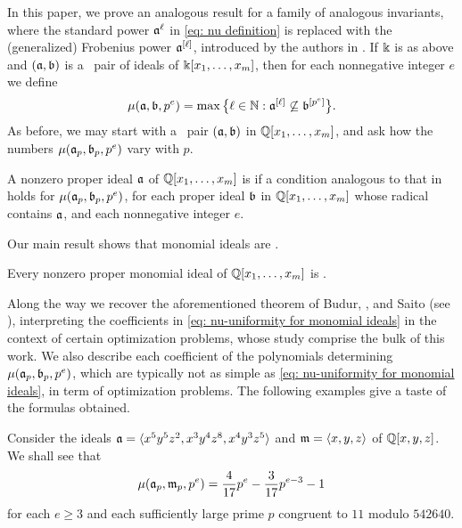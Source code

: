\documentclass{amsart}
\begin{document}
In this paper, we prove an analogous result for a family of analogous invariants, where the standard power $\mathfrak{a}^\ell$ in \eqref{eq: nu definition} is replaced with the (generalized) Frobenius power $\mathfrak{a}^{[\ell]}$, introduced by the authors in \cite{hernandez+etal.frobenius_powers}.
If $\Bbbk$ is as above and $(\mathfrak{a},\mathfrak{b})$ is a \compatible\ pair of ideals of $\Bbbk[x_1, \ldots, x_m]$, then for each nonnegative integer $e$ we define
\[\mu(\mathfrak{a},\mathfrak{b},p^e) = \max\big\{\ell\in \mathbb{N} : \mathfrak{a}^{[\ell]} \not\subseteq \mathfrak{b}^{[p^e]}\big\}.\]
As before, we may start with a \compatible\ pair $(\mathfrak{a},\mathfrak{b})$ in $\mathbb{Q}[x_1,\ldots,x_m]$, and ask how the numbers $\mu(\mathfrak{a}_p,\mathfrak{b}_p,p^e)$ vary with $p$.

\begin{definition}
   \label{defn: muCool}
   A nonzero proper ideal $\mathfrak{a}$ of $\mathbb{Q}[x_1,\ldots,x_m]$ is \emph{\muCool} if a condition analogous to that in 
   holds for $\mu(\mathfrak{a}_p,\mathfrak{b}_p,p^e)$, for each proper ideal $\mathfrak{b}$ in $\mathbb{Q}[x_1,\ldots,x_m]$ whose radical contains $\mathfrak{a}$, and each nonnegative integer $e$.
\end{definition}

Our main result shows that monomial ideals are \muCool.
\begin{thmintro}[\textcolor{nicered}{ADD CROSS-REFERENCE}]
   \label{main theorem}
   Every nonzero proper monomial ideal of $\mathbb{Q}[x_1,\ldots,x_m]$ is \muCool.
\end{thmintro}

Along the way we recover the aforementioned theorem of Budur, \mustata, and Saito (see ), interpreting the coefficients in \eqref{eq: nu-uniformity for monomial ideals} in the context of certain optimization problems, whose study comprise the bulk of this work. 
We also describe each coefficient of the polynomials determining $\mu(\mathfrak{a}_p,\mathfrak{b}_p,p^e)$, which are typically not as simple as \eqref{eq: nu-uniformity for monomial ideals}, in term of optimization problems.
The following examples give a taste of the formulas obtained.

\begin{example}
   \label{ex1 intro}
   Consider the ideals $\mathfrak{a} = \langle x^5 y^5 z^2, x^3 y^4 z^8, x^4 y^3 z^5 \rangle$ and $\mathfrak{m} = \langle x,y,z \rangle$ of $\mathbb{Q}[x,y,z]$.
   We shall see that
   \[
      \mu(\mathfrak{a}_p,\mathfrak{m}_p,p^e) = \frac{4}{17}p^e - \frac{3}{17}p^{e-3}  - 1
    \]
    for each $e\ge 3$ and each sufficiently large prime $p$ congruent to $11$ modulo $\num{542640}$.
\end{example}
\end{document}
